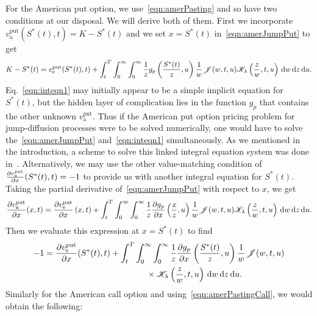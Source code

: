         	For the American put option, we use~\eqref{eqn:amerPasting} and so have two conditions at our disposal. We will derive both of them. First we incorporate $v_{\text{a}}^{\text{put}}(S^*(t),t) = K - S^*(t)$ and we set $x = S^*(t)$ in~\eqref{eqn:amerJumpPut} to get
        	\begin{equation}
        		\label{eqn:inteqn1}
        		\begin{split}
        		K - S^*(t) = v_{\text{e}}^{\text{put}}(S^*(t),t) + \int_t^T \int_0^\infty \int_0^\infty \frac{1}{z}g_p\left(\frac{S^*(t)}{z},u\right) \frac{1}{w}\mathscr J(w,t,u)\mathscr K_\lambda\left( \frac{z}{w},t,u \right) \, \mathrm d w \, \mathrm d z \, \mathrm d u.
        		\end{split}
        	\end{equation}
        	Eq.~\eqref{eqn:inteqn1} may initially appear to be a simple implicit equation for $S^*(t)$, but the hidden layer of complication lies in the function $g_p$ that contains the other unknown $v_{\text{a}}^{\text{put}}$. Thus if the American put option pricing problem for jump-diffusion processes were to be solved numerically, one would have to solve the~\eqref{eqn:amerJumpPut} and~\eqref{eqn:inteqn1} simultaneously. As we mentioned in the introduction, a scheme to solve this linked integral equation system was done in~\cite{Chiarella2006}. Alternatively, we may use the other value-matching condition of $\frac{\partial v_{\text{a}}^{\text{put}}}{\partial x}(S^*(t),t) = -1$ to provide us with another integral equation for $S^*(t)$. Taking the partial derivative of~\eqref{eqn:amerJumpPut} with respect to $x$, we get
        	$$
        		\frac{\partial v_{\text{a}}^{\text{put}}}{\partial x}( x, t) = \frac{\partial v_{\text{e}}^{\text{put}}}{\partial x}\left(x,t\right) + \int_t^T \int_0^\infty \int_0^\infty \frac{1}{z}\frac{\partial g_p}{\partial x}\left(\frac{x}{z},u\right) \frac{1}{w}\mathscr J(w,t,u)\mathscr K_\lambda\left( \frac{z}{w},t,u \right) \, \mathrm d w \, \mathrm d z \, \mathrm d u.
        	$$
Then we evaluate this expression at $x = S^*(t)$ to find
		\begin{equation}
			\label{eqn:inteqn2}
			\begin{split}
			-1 &=  \frac{\partial v_{\text{e}}^{\text{put}}}{\partial x}( S^*(t),t) + \int_t^T \int_0^\infty \int_0^\infty \frac{1}{z}\frac{\partial g_p}{\partial x}\left(\frac{ S^*(t)}{z},u\right) \frac{1}{w}\mathscr J(w,t,u) \\
			&\qquad\qquad\qquad\qquad\qquad\qquad \times \mathscr K_\lambda\left( \frac{z}{w},t,u \right) \, \mathrm d w \, \mathrm d z \, \mathrm d u.
			\end{split}
		\end{equation}
Similarly for the American call option and using~\eqref{eqn:amerPastingCall}, we would obtain the following:
